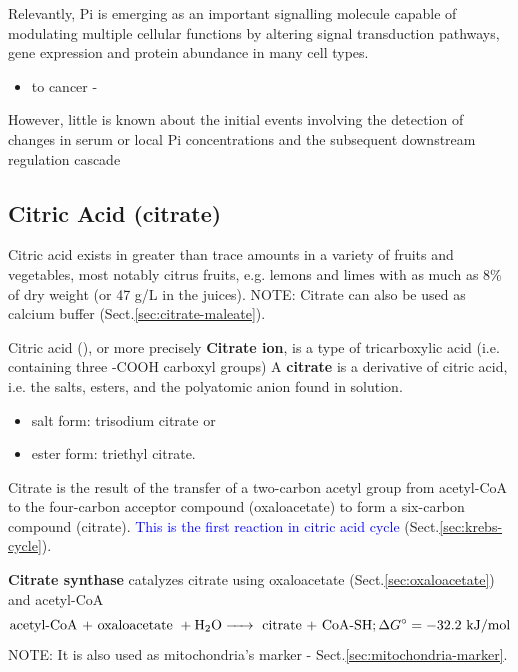 Relevantly, Pi is emerging as an important signalling molecule capable of
modulating multiple cellular functions by altering signal transduction pathways,
gene expression and protein abundance in many cell types.
\begin{itemize}
  \item to cancer - %
\end{itemize}

However, little is known about the initial events involving the detection of
changes in serum or local Pi concentrations and the subsequent downstream
regulation cascade





\subsection{Citric Acid (citrate)}
\label{sec:citric-acid}
\label{sec:citrate}
\label{sec:citrate-synthase}

\begin{mdframed}
Citric acid exists in greater than trace amounts in a variety of fruits and
vegetables, most notably citrus fruits, e.g. lemons and limes with as much as
8\% of dry weight (or 47 g/L in the juices). NOTE: Citrate can also be used as
calcium buffer (Sect.\ref{sec:citrate-maleate}).
\end{mdframed}


Citric acid (), or more precisely {\bf Citrate ion}, is
a type of tricarboxylic acid (i.e. containing three -COOH carboxyl groups)
A {\bf citrate} is a derivative of citric acid, i.e. the salts, esters, and
the polyatomic anion found in solution.
\begin{itemize}
  \item salt form: trisodium citrate  or 
  \item ester form: triethyl citrate.
\end{itemize}

Citrate is the result of the transfer of a two-carbon acetyl group from
acetyl-CoA to the four-carbon acceptor compound (oxaloacetate) to form a
six-carbon compound (citrate). \textcolor{blue}{This is the first reaction in
citric acid cycle} (Sect.\ref{sec:krebs-cycle}).

{\bf Citrate synthase} catalyzes citrate using oxaloacetate
(Sect.\ref{sec:oxaloacetate}) and acetyl-CoA
\begin{equation}
\text{acetyl-CoA  + oxaloacetate } + \ce{H2O -> } \text{ citrate + CoA-SH};
\Delta G^\circ = -32.2 \text{ kJ/mol}
\end{equation}
NOTE: It is also used as mitochondria's marker -
Sect.\ref{sec:mitochondria-marker}.

